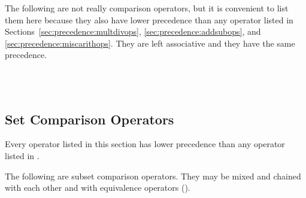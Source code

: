 The following are not really comparison operators, but it is convenient to list them here
because they also have lower precedence than any operator listed in
Sections~\ref{sec:precedence:multdivops}, \ref{sec:precedence:addsubops},
and \ref{sec:precedence:miscarithops}.
They are left associative and they have the same precedence.
\begin{tabbing}
\UnicodeKillLine
{} \\
 \\
\end{tabbing}

\subsection{Set Comparison Operators}

Every operator listed in this section
has lower precedence than any operator listed in .

The following are subset comparison operators.  They may be mixed and chained
with each other and with equivalence operators
().
\begin{tabbing}
\UnicodeKillLine
{} \\
 \\
 \\
 \\
 \\
 \\
 \\
 \\
 \\
 \\
 \\
 \\
 \\
 \\
 \\
\end{tabbing}

